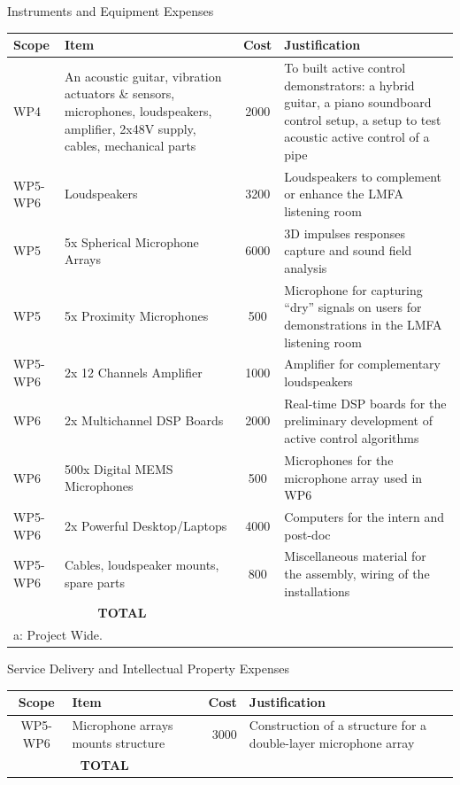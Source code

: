 \documentclass[a4paper,9pt]{extarticle}
\newcommand{\secfont}{\noindent\color{ANRblue}\normalfont\sffamily}
\begin{document}
{\secfont Instruments and Equipment Expenses}
\noindent
\begin{center}
\begin{tabular}{p{1.6cm} | p{5.5cm} | c | p{9cm}}
\textbf{Scope} & \textbf{Item} & \textbf{Cost} & \textbf{Justification}\\
\hline
\hline
WP4	& An acoustic guitar, vibration actuators \& sensors, microphones, loudspeakers, amplifier, 2x48V supply, cables, mechanical parts & 2000 & To built active control demonstrators: a hybrid guitar, a piano soundboard control setup, a setup to test acoustic active control of a pipe  \\	
\hline
WP5-WP6	&  Loudspeakers &	3200	& Loudspeakers to complement or enhance the LMFA listening room \\
\hline 
WP5	& 5x Spherical Microphone Arrays &	6000 & 3D impulses responses capture and sound field analysis \\
\hline 
WP5	& 5x Proximity Microphones & 500 &	Microphone for capturing ``dry''
signals on users for demonstrations in the LMFA listening room \\
\hline 
WP5-WP6	& 2x 12 Channels Amplifier & 1000 &	Amplifier for complementary loudspeakers \\
\hline 
WP6	& 2x Multichannel DSP Boards & 2000	& Real-time DSP boards for the preliminary development of active control algorithms \\
\hline 
WP6	& 500x Digital MEMS Microphones	& 500 & Microphones for the microphone array used in WP6 \\
\hline 
WP5-WP6	& 2x Powerful Desktop/Laptops &	4000 &	Computers for the intern and post-doc \\
\hline 
WP5-WP6	& Cables, loudspeaker mounts, spare parts & 800	& Miscellaneous material for the assembly, wiring of the installations	\\
\hline
\hline
\multicolumn{2}{c}{\textbf{TOTAL}} 20 000 \euro{} \\
\hline
\multicolumn{4}{l}{a: Project Wide.}
\end{tabular}
\end{center}		

{\secfont Service Delivery and Intellectual Property Expenses}

\noindent
\begin{center}
\begin{tabular}{c | p{3cm} | r | p{10cm}}
\textbf{Scope} & \textbf{Item} & \textbf{Cost} & \textbf{Justification}\\
\hline
\hline
WP5-WP6 & Microphone arrays mounts structure &	3000 & Construction of a structure for a double-layer microphone array \\
\hline
\hline
\multicolumn{2}{c}{\textbf{TOTAL}} 3 000 \euro{} \\
\hline
\end{tabular}
\end{center}
\end{document}
